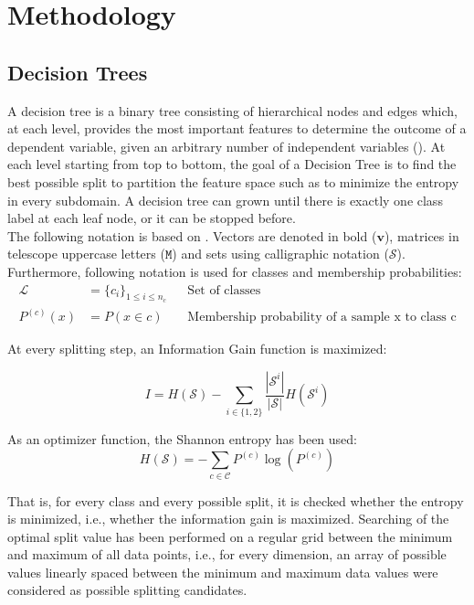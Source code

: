 \documentclass{article}
\begin{document}
\section{Methodology}

\subsection{Decision Trees}
A decision tree is a binary tree consisting of hierarchical nodes and edges which, at each level, provides the most important features to determine the outcome of a dependent variable, given an arbitrary number of independent variables (\cite{decisionForests-MSR}). At each level starting from top to bottom, the goal of a Decision Tree is to find the best possible split to partition the feature space such as to minimize the entropy in every subdomain. A decision tree can grown until there is exactly one class label at each leaf node, or it can be stopped before.\\

The following notation is based on \cite{decisionForests-MSR}. Vectors are denoted in bold ($\boldsymbol{v}$), matrices in telescope uppercase letters ($\mathtt{M}$) and sets using calligraphic notation ($\mathcal{S}$). Furthermore, following notation is used for classes and membership probabilities:
\begin{align}
\mathcal{L}&=\{c_i\}_{1\leq i\leq n_c}&& \text{Set of classes}\\
P^{(c)}(x)&=P(x\in c)&& \text{Membership probability of a sample x to class c}
\end{align}

At every splitting step, an Information Gain function is maximized:

\begin{equation}
    \label{eq:ig}
    I = H(\mathcal{S})-\sum_{i\in \{1,2\}}\frac{|\mathcal{S}^i|}{|\mathcal{S}|}H(\mathcal{S}^i)
\end{equation}

As an optimizer function, the Shannon entropy has been used:
\begin{equation}
    H(\mathcal{S}) = -\sum_{c\in\mathcal{C}}P^{(c)}\log(P^{(c)})
\end{equation}

That is, for every class and every possible split, it is checked whether the entropy is minimized, i.e., whether the information gain is maximized. Searching of the optimal split value has been performed on a regular grid between the minimum and maximum of all data points, i.e.,  for every dimension, an array of possible values linearly spaced between the minimum and maximum data values were considered as possible splitting candidates.\\
\end{document}
